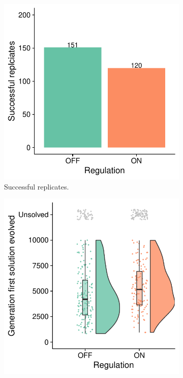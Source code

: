 \begin{figure}[ht]
\centering

\begin{subfigure}[b]{0.45\textwidth}
    \centering
    \includegraphics[width=\linewidth]{chapters/05-tag-based-genetic-regulation/media/boolean-calc-postfix-solution-counts.pdf}
    \caption{\small Successful replicates.}
    \label{chapter:tag-based-regulation:subfig:boolean-calc-postfix-solution-count}
\end{subfigure}
\hfill
\begin{subfigure}[b]{0.45\textwidth}
    \centering
    \includegraphics[width=\textwidth]{chapters/05-tag-based-genetic-regulation/media/boolean-calc-postfix-solve-time-cloud.pdf}

\end{subfigure}
\end{figure}

